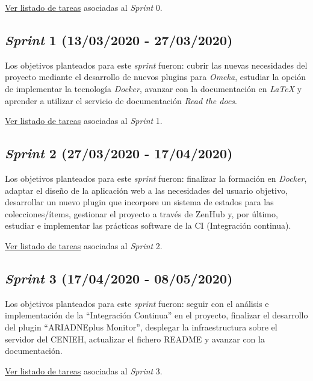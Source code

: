 \href{https://github.com/gcm1001/TFG-CeniehAriadne/milestone/1}{Ver
listado de tareas} asociadas al \emph{Sprint} 0.


\subsection{\emph{Sprint} 1 (13/03/2020 - 27/03/2020)}
Los objetivos planteados para este \emph{sprint} fueron: cubrir las
nuevas necesidades del proyecto mediante el desarrollo de nuevos plugins
para \emph{Omeka}, estudiar la opción de implementar la tecnología
\emph{Docker}, avanzar con la documentación en \emph{LaTeX} y aprender a
utilizar el servicio de documentación \emph{Read the docs}.

\href{https://github.com/gcm1001/TFG-CeniehAriadne/milestone/2}{Ver listado
de tareas} asociadas al \emph{Sprint} 1.


\subsection{\emph{Sprint} 2 (27/03/2020 - 17/04/2020)}

Los objetivos planteados para este \emph{sprint} fueron: finalizar la
formación en \emph{Docker}, adaptar el diseño de la aplicación web a las
necesidades del usuario objetivo, desarrollar un nuevo plugin que
incorpore un sistema de estados para las colecciones/ítems, gestionar el
proyecto a través de ZenHub y, por último, estudiar e implementar las
prácticas software de la CI (Integración continua).

\href{https://github.com/gcm1001/TFG-CeniehAriadne/milestone/3}{Ver
listado de tareas} asociadas al \emph{Sprint} 2.



\subsection{\emph{Sprint} 3 (17/04/2020 - 08/05/2020)}

Los objetivos planteados para este \emph{sprint} fueron: seguir con el
análisis e implementación de la ``Integración Continua'' en el proyecto,
finalizar el desarrollo del plugin ``ARIADNEplus Monitor'', desplegar la
infraestructura sobre el servidor del CENIEH, actualizar el fichero
README y avanzar con la documentación.

\href{https://github.com/gcm1001/TFG-CeniehAriadne/milestone/4}{Ver
listado de tareas} asociadas al \emph{Sprint} 3.

